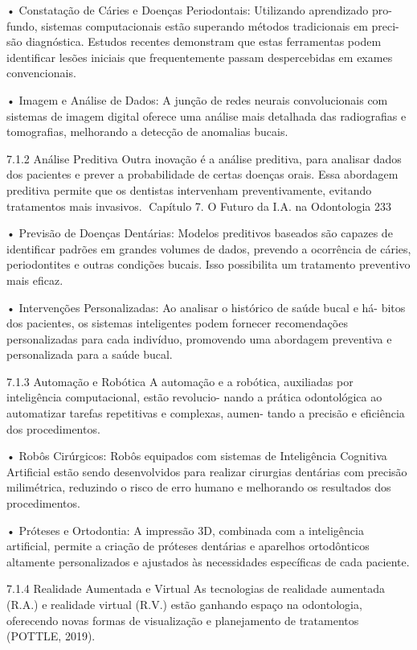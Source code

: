    • Constatação de Cáries e Doenças Periodontais: Utilizando aprendizado pro-
      fundo, sistemas computacionais estão superando métodos tradicionais em preci-
      são diagnóstica. Estudos recentes demonstram que estas ferramentas podem
      identificar lesões iniciais que frequentemente passam despercebidas em exames
      convencionais.

    • Imagem e Análise de Dados: A junção de redes neurais convolucionais com
      sistemas de imagem digital oferece uma análise mais detalhada das radiografias
      e tomografias, melhorando a detecção de anomalias bucais.

7.1.2    Análise Preditiva
Outra inovação é a análise preditiva, para analisar dados dos pacientes e prever a
probabilidade de certas doenças orais. Essa abordagem preditiva permite que os
dentistas intervenham preventivamente, evitando tratamentos mais invasivos.
Capítulo 7. O Futuro da I.A. na Odontologia                                             233


    • Previsão de Doenças Dentárias: Modelos preditivos baseados são capazes
      de identificar padrões em grandes volumes de dados, prevendo a ocorrência de
      cáries, periodontites e outras condições bucais. Isso possibilita um tratamento
      preventivo mais eficaz.

    • Intervenções Personalizadas: Ao analisar o histórico de saúde bucal e há-
      bitos dos pacientes, os sistemas inteligentes podem fornecer recomendações
      personalizadas para cada indivíduo, promovendo uma abordagem preventiva e
      personalizada para a saúde bucal.

7.1.3     Automação e Robótica
A automação e a robótica, auxiliadas por inteligência computacional, estão revolucio-
nando a prática odontológica ao automatizar tarefas repetitivas e complexas, aumen-
tando a precisão e eficiência dos procedimentos.

    • Robôs Cirúrgicos: Robôs equipados com sistemas de Inteligência Cognitiva
      Artificial estão sendo desenvolvidos para realizar cirurgias dentárias com precisão
      milimétrica, reduzindo o risco de erro humano e melhorando os resultados dos
      procedimentos.

    • Próteses e Ortodontia: A impressão 3D, combinada com a inteligência artificial,
      permite a criação de próteses dentárias e aparelhos ortodônticos altamente
      personalizados e ajustados às necessidades específicas de cada paciente.

7.1.4     Realidade Aumentada e Virtual
As tecnologias de realidade aumentada (R.A.) e realidade virtual (R.V.) estão ganhando
espaço na odontologia, oferecendo novas formas de visualização e planejamento de
tratamentos (POTTLE, 2019).

